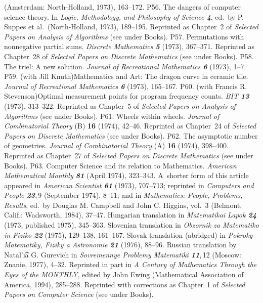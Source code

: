  (Amsterdam: North-Holland, 1973), 163--172.
\p P56. The dangers of computer science theory. In {\sl Logic, Methodology,
 and Philosophy of Science\/ \bf 4}, ed.\ by P. Suppes et al.\ (North-Holland,
 1973), 189--195.
 Reprinted as Chapter~2 of {\sl Selected Papers on Analysis of Algorithms\/}
 (see under Books).
\p P57.  Permutations with nonnegative partial sums.  {\sl Discrete
 Mathematics\/ \bf 5} (1973), 367--371.  
 Reprinted as Chapter~28 of {\sl Selected Papers on
 Discrete Mathematics\/} (see under Books).
\p P58.  The triel:  A new solution.  {\sl Journal of Recreational
 Mathe\-ma\-tics\/ \bf 6} (1973), 1--7.  
\p P59.  (with Jill Knuth)\xskip  Mathematics and Art:  The dragon curve
 in ceramic tile.  {\sl Journal of Recreational Mathematics\/ \bf 6} (1973),
 165--167.  
\p P60.  (with Francis R. Stevenson)\xskip  Optimal measurement points for
 program frequency counts.  {\sl BIT\/ \bf 13} (1973), 313--322.  
 Reprinted as Chapter~5 of {\sl Selected Papers on Analysis of Algorithms\/}
 (see under Books).
\p P61.  Wheels within wheels. {\sl Journal of Combinatorial Theory\/} (B)
 {\bf 16} (1974), 42--46.  
 Reprinted as Chapter~24 of {\sl Selected Papers on
 Discrete Mathematics\/} (see under Books).
\p P62.  The asymptotic number of geometries.  {\sl Journal of
 Combinatorial Theory\/} (A) {\bf 16} (1974), 398--400.  
 Reprinted as Chapter~27 of {\sl Selected Papers on
 Discrete Mathematics\/} (see under Books).
\p P63.  Computer Science and its relation to Mathematics. {\sl American
 Mathematical Monthly\/ \bf 81} (April 1974), 323--343. A~shorter form of
 this article appeared in {\sl American Scientist\/ \bf 61} (1973), 707--713;
 reprinted in {\sl Computers and People\/ \bf 23},\,9 (September 1974), 8--11;
 and in {\sl Mathematics: People, Problems, Results}, ed.\ by Douglas M.
 Campbell and John C. Higgins, vol.~3 (Belmont, Calif.:  Wadsworth, 1984),
 37--47.  Hungarian translation in {\sl Matematikai Lapok\/ \bf 24} (1973,
 published 1975), 345--363.  Slovenian translation in {\sl Obzornik za
 Matematiko in Fiziko\/ \bf22} (1975), 129--138, 161--167. Slovak translation
 (abridged) in {\sl Pokroky Matematiky, Fiziky a Astronomie\/ \bf21} (1976),
 88--96.  Russian translation by Natal'\t\i a G. Gurevich in
 {\sl Sovremennye Problemy Matematiki\/ \bf11},\,12 (Moscow: Znanie, 1977),
 4--32. Reprinted in part in {\sl A Century of Mathematics Through the
 Eyes of the M{\eightsl ONTHLY}}, edited by John Ewing (Mathematical
 Association of America, 1994), 285--288.
 Reprinted with corrections as Chapter~1 of {\sl Selected Papers on
 Computer Science\/} (see under Books).
